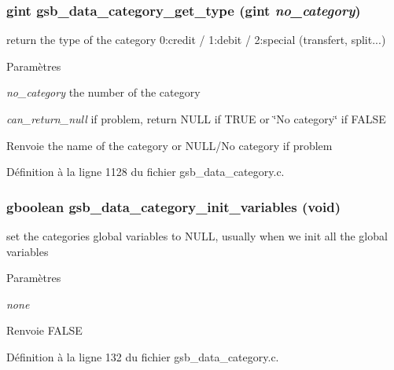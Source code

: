 \subsubsection[{gsb\_\-data\_\-category\_\-get\_\-type}]{\setlength{\rightskip}{0pt plus 5cm}gint gsb\_\-data\_\-category\_\-get\_\-type (gint {\em no\_\-category})}\label{gsb__data__category_8h_ad207c5dac58f010fe8c73c4e2f2f5a58}
return the type of the category 0:credit / 1:debit / 2:special (transfert, split...)


\begin{DoxyParams}{Paramètres}
\item[{\em no\_\-category}]the number of the category \item[{\em can\_\-return\_\-null}]if problem, return NULL if TRUE or \char`\"{}No category\char`\"{} if FALSE\end{DoxyParams}
\begin{DoxyReturn}{Renvoie}
the name of the category or NULL/No category if problem 
\end{DoxyReturn}


Définition à la ligne 1128 du fichier gsb\_\-data\_\-category.c.

\subsubsection[{gsb\_\-data\_\-category\_\-init\_\-variables}]{\setlength{\rightskip}{0pt plus 5cm}gboolean gsb\_\-data\_\-category\_\-init\_\-variables (void)}\label{gsb__data__category_8h_a0efec43fb6122b3f83bf71995d2a2459}
set the categories global variables to NULL, usually when we init all the global variables


\begin{DoxyParams}{Paramètres}
\item[{\em none}]\end{DoxyParams}
\begin{DoxyReturn}{Renvoie}
FALSE 
\end{DoxyReturn}


Définition à la ligne 132 du fichier gsb\_\-data\_\-category.c.

